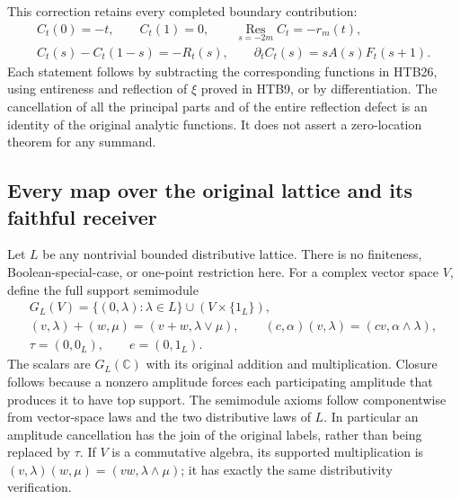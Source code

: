 \documentclass[11pt]{article}
\theoremstyle{definition}
\begin{document}
This correction retains every completed boundary contribution:
\begin{equation}\tag{HTB28}
\begin{gathered}
 C_t(0)=-t,\qquad C_t(1)=0,\qquad
 \operatorname*{Res}_{s=-2m}C_t=-r_m(t),\\
 C_t(s)-C_t(1-s)=-R_t(s),\qquad
 \partial_t C_t(s)=sA(s)F_t(s+1).
\end{gathered}
\end{equation}
Each statement follows by subtracting the corresponding functions in
HTB26, using entireness and reflection of $\xi$ proved in HTB9, or by
differentiation. The cancellation of all the principal parts and of
the entire reflection defect is an identity of the original analytic
functions. It does not assert a zero-location theorem for any summand.

\subsection{Every map over the original lattice and its faithful receiver}

Let $L$ be any nontrivial bounded distributive lattice. There is no
finiteness, Boolean-special-case, or one-point restriction here. For a
complex vector space $V$, define the full support semimodule
\begin{equation}\tag{HTB29}
\begin{gathered}
 G_L(V)=\{(0,\lambda):\lambda\in L\}\cup(V\times\{1_L\}),\\
 (v,\lambda)+(w,\mu)=(v+w,\lambda\vee\mu),\qquad
 (c,\alpha)(v,\lambda)=(cv,\alpha\wedge\lambda),\\
 \tau=(0,0_L),\qquad e=(0,1_L).
\end{gathered}
\end{equation}
The scalars are $G_L(\mathbb C)$ with its original addition and
multiplication. Closure follows because a nonzero amplitude forces
each participating amplitude that produces it to have top support.
The semimodule axioms follow componentwise from vector-space laws and
the two distributive laws of $L$. In particular an amplitude
cancellation has the join of the original labels, rather than being
replaced by $\tau$. If $V$ is a commutative algebra, its supported
multiplication is $(v,\lambda)(w,\mu)=(vw,\lambda\wedge\mu)$; it
has exactly the same distributivity verification.
\end{document}
